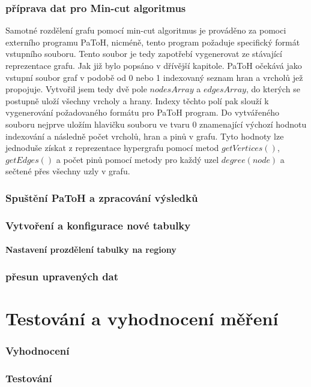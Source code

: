 \documentclass[thesis=M,czech]{FITthesis}[2012/06/26]
\begin{document}
\subsection{příprava dat pro Min-cut algoritmus}
Samotné rozdělení grafu pomocí min-cut algoritmus je prováděno za pomoci externího programu PaToH, nicméně, tento program požaduje specifický formát vstupního souboru. Tento soubor je tedy zapotřebí vygenerovat ze stávající reprezentace grafu. Jak již bylo popsáno v dřívější kapitole. PaToH očekává jako vstupní soubor graf v podobě od 0 nebo 1 indexovaný seznam hran a vrcholů jež propojuje.  Vytvořil jsem tedy dvě pole $nodesArray$ a $edgesArray$, do kterých se postupně uloží všechny vrcholy a hrany. Indexy těchto polí pak slouží k vygenerování požadovaného formátu pro PaToH program. Do vytvářeného souboru nejprve uložím hlavičku souboru ve tvaru 0 znamenající výchozí hodnotu indexování a následně počet vrcholů, hran a pinů v grafu. Tyto hodnoty lze jednoduše získat z reprezentace hypergrafu pomocí metod $getVertices()$, $getEdges()$ a počet pinů pomocí metody pro každý uzel $degree(node)$ a sečtené přes všechny uzly v grafu.


\subsection{Spuštění PaToH a zpracování výsledků}

\subsection{Vytvoření a konfigurace nové tabulky}
\subsubsection{Nastavení prozdělení tabulky na regiony}
\subsection{přesun upravených dat}


\chapter{Testování a vyhodnocení měření}
\subsection{Vyhodnocení}
\subsection{Testování}
\end{document}
